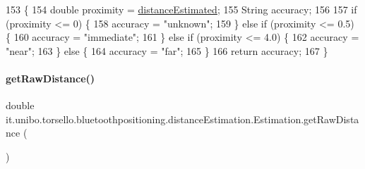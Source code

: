 \begin{DoxyCode}
153                                  \{
154         \textcolor{keywordtype}{double} proximity = \hyperlink{classit_1_1unibo_1_1torsello_1_1bluetoothpositioning_1_1distanceEstimation_1_1Estimation_a7a5514b25ac6495842a53e54319be10d_a7a5514b25ac6495842a53e54319be10d}{distanceEstimated};
155         String accuracy;
156 
157         \textcolor{keywordflow}{if} (proximity <= 0) \{
158             accuracy = \textcolor{stringliteral}{"unknown"};
159         \} \textcolor{keywordflow}{else} \textcolor{keywordflow}{if} (proximity <= 0.5) \{
160             accuracy = \textcolor{stringliteral}{"immediate"};
161         \} \textcolor{keywordflow}{else} \textcolor{keywordflow}{if} (proximity <= 4.0) \{
162             accuracy = \textcolor{stringliteral}{"near"};
163         \} \textcolor{keywordflow}{else} \{
164             accuracy = \textcolor{stringliteral}{"far"};
165         \}
166         \textcolor{keywordflow}{return} accuracy;
167     \}
\end{DoxyCode}
\hypertarget{classit_1_1unibo_1_1torsello_1_1bluetoothpositioning_1_1distanceEstimation_1_1Estimation_ad355b2e850a8d6013ef771eecd740e1b_ad355b2e850a8d6013ef771eecd740e1b}{}\label{classit_1_1unibo_1_1torsello_1_1bluetoothpositioning_1_1distanceEstimation_1_1Estimation_ad355b2e850a8d6013ef771eecd740e1b_ad355b2e850a8d6013ef771eecd740e1b} 
\paragraph{\texorpdfstring{get\+Raw\+Distance()}{getRawDistance()}}
{\footnotesize\ttfamily double it.\+unibo.\+torsello.\+bluetoothpositioning.\+distance\+Estimation.\+Estimation.\+get\+Raw\+Distance (\begin{DoxyParamCaption}{ }\end{DoxyParamCaption})}



